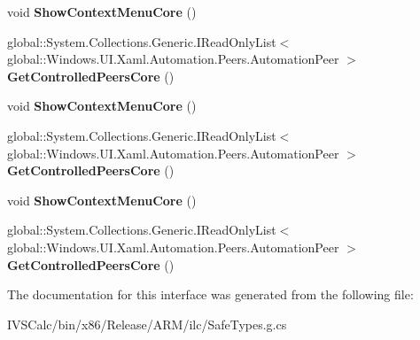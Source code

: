 \begin{DoxyCompactItemize}
\item 
\mbox{\label{interface_windows_1_1_u_i_1_1_xaml_1_1_automation_1_1_peers_1_1_i_automation_peer_overrides2_aaa6a5d94c2ff7373d5a1a1828b2e8327}} 
void {\bfseries Show\+Context\+Menu\+Core} ()
\item 
\mbox{\label{interface_windows_1_1_u_i_1_1_xaml_1_1_automation_1_1_peers_1_1_i_automation_peer_overrides2_a67a4e7bd48e87eab95f6dde4eb96dfeb}} 
global\+::\+System.\+Collections.\+Generic.\+I\+Read\+Only\+List$<$ global\+::\+Windows.\+U\+I.\+Xaml.\+Automation.\+Peers.\+Automation\+Peer $>$ {\bfseries Get\+Controlled\+Peers\+Core} ()
\item 
\mbox{\label{interface_windows_1_1_u_i_1_1_xaml_1_1_automation_1_1_peers_1_1_i_automation_peer_overrides2_aaa6a5d94c2ff7373d5a1a1828b2e8327}} 
void {\bfseries Show\+Context\+Menu\+Core} ()
\item 
\mbox{\label{interface_windows_1_1_u_i_1_1_xaml_1_1_automation_1_1_peers_1_1_i_automation_peer_overrides2_a67a4e7bd48e87eab95f6dde4eb96dfeb}} 
global\+::\+System.\+Collections.\+Generic.\+I\+Read\+Only\+List$<$ global\+::\+Windows.\+U\+I.\+Xaml.\+Automation.\+Peers.\+Automation\+Peer $>$ {\bfseries Get\+Controlled\+Peers\+Core} ()
\item 
\mbox{\label{interface_windows_1_1_u_i_1_1_xaml_1_1_automation_1_1_peers_1_1_i_automation_peer_overrides2_aaa6a5d94c2ff7373d5a1a1828b2e8327}} 
void {\bfseries Show\+Context\+Menu\+Core} ()
\item 
\mbox{\label{interface_windows_1_1_u_i_1_1_xaml_1_1_automation_1_1_peers_1_1_i_automation_peer_overrides2_a67a4e7bd48e87eab95f6dde4eb96dfeb}} 
global\+::\+System.\+Collections.\+Generic.\+I\+Read\+Only\+List$<$ global\+::\+Windows.\+U\+I.\+Xaml.\+Automation.\+Peers.\+Automation\+Peer $>$ {\bfseries Get\+Controlled\+Peers\+Core} ()
\end{DoxyCompactItemize}


The documentation for this interface was generated from the following file\+:\begin{DoxyCompactItemize}
\item 
I\+V\+S\+Calc/bin/x86/\+Release/\+A\+R\+M/ilc/Safe\+Types.\+g.\+cs\end{DoxyCompactItemize}
